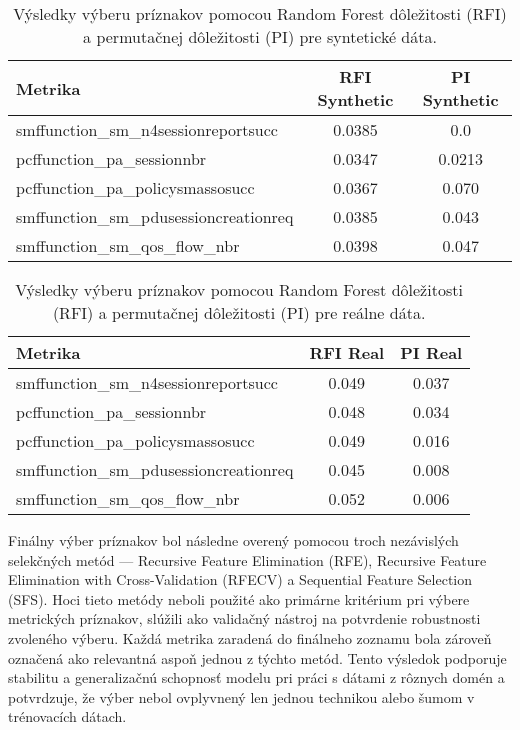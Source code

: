 \begin{table}[H]
\centering
\caption{Výsledky výberu príznakov pomocou Random Forest dôležitosti (RFI) a permutačnej dôležitosti (PI) pre syntetické dáta.}
\begin{tabular}{|l|c|c|}
\hline
Metrika & RFI Synthetic & PI Synthetic \\
\hline
smffunction\_sm\_n4sessionreportsucc & 0.0385 & 0.0 \\
pcffunction\_pa\_sessionnbr & 0.0347 & 0.0213 \\
pcffunction\_pa\_policysmassosucc & 0.0367 & 0.070 \\
smffunction\_sm\_pdusessioncreationreq & 0.0385 & 0.043 \\
smffunction\_sm\_qos\_flow\_nbr & 0.0398 & 0.047 \\
\hline
\end{tabular}
\label{table:feature-selection-synthetic}
\end{table}

\begin{table}[H]
\centering
\caption{Výsledky výberu príznakov pomocou Random Forest dôležitosti (RFI) a permutačnej dôležitosti (PI) pre reálne dáta.}
\begin{tabular}{|l|c|c|}
\hline
Metrika & RFI Real & PI Real \\
\hline
smffunction\_sm\_n4sessionreportsucc & 0.049 & 0.037 \\
pcffunction\_pa\_sessionnbr & 0.048 & 0.034 \\
pcffunction\_pa\_policysmassosucc & 0.049 & 0.016 \\
smffunction\_sm\_pdusessioncreationreq & 0.045 & 0.008 \\
smffunction\_sm\_qos\_flow\_nbr & 0.052 & 0.006 \\
\hline
\end{tabular}
\label{table:feature-selection-real}
\end{table}

Finálny výber príznakov bol následne overený pomocou troch nezávislých selekčných metód — Recursive Feature Elimination (RFE), Recursive Feature Elimination with Cross-Validation (RFECV) a Sequential Feature Selection (SFS). Hoci tieto metódy neboli použité ako primárne kritérium pri výbere metrických príznakov, slúžili ako validačný nástroj na potvrdenie robustnosti zvoleného výberu. Každá metrika zaradená do finálneho zoznamu bola zároveň označená ako relevantná aspoň jednou z týchto metód. Tento výsledok podporuje stabilitu a generalizačnú schopnosť modelu pri práci s dátami z rôznych domén a potvrdzuje, že výber nebol ovplyvnený len jednou technikou alebo šumom v trénovacích dátach.


